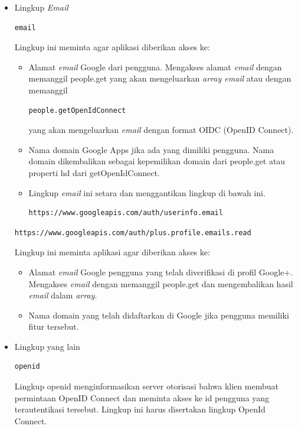\begin{itemize}
\item Lingkup {\it Email}\\
\begin{lstlisting}[basicstyle=\footnotesize]
email
\end{lstlisting}
Lingkup ini meminta agar aplikasi diberikan akses ke:
\begin{itemize}
\item
Alamat {\it email} Google dari pengguna. Mengakses alamat {\it email} dengan memanggil people.get yang akan mengeluarkan {\it array email} atau dengan memanggil
\begin{lstlisting}[basicstyle=\footnotesize]
people.getOpenIdConnect
\end{lstlisting}
yang akan mengeluarkan {\it email} dengan format OIDC (OpenID Connect).
\item
Nama domain Google Apps jika ada yang dimiliki pengguna. Nama domain
dikembalikan sebagai kepemilikan domain dari people.get atau properti hd dari getOpenIdConnect.
\item
Lingkup {\it email} ini setara dan menggantikan lingkup di bawah ini.
\begin{lstlisting}[basicstyle=\footnotesize]
https://www.googleapis.com/auth/userinfo.email
\end{lstlisting}
\end{itemize}
\begin{lstlisting}[basicstyle=\footnotesize]
https://www.googleapis.com/auth/plus.profile.emails.read
\end{lstlisting}
Lingkup ini meminta aplikasi agar diberikan akses ke:
\begin{itemize}
\item
Alamat {\it email} Google pengguna yang telah diverifikasi di profil Google+. Mengakses {\it email} dengan memanggil people.get dan mengembalikan hasil {\it email} dalam {\it array}.
\item
Nama domain yang telah didaftarkan di Google jika pengguna memiliki fitur tersebut.
\end{itemize}

\item Lingkup yang lain\\
\begin{lstlisting}[basicstyle=\footnotesize]
openid
\end{lstlisting}
Lingkup openid menginformasikan server otorisasi bahwa klien membuat permintaan OpenID Connect dan meminta akses ke id pengguna yang terautentikasi tersebut. Lingkup ini harus disertakan lingkup OpenId Connect.


\end{itemize}
